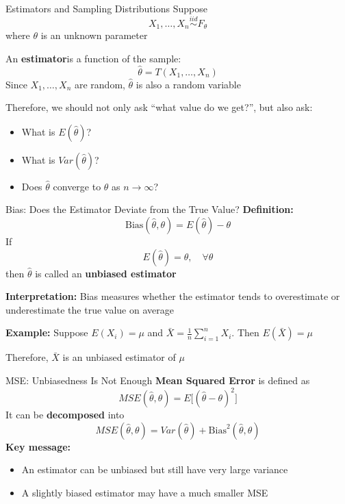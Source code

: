 \documentclass[aspectratio=169,12pt]{beamer}
\begin{document}
\begin{frame}{Estimators and Sampling Distributions}
    Suppose $$X_1, \dots,X_n \overset{iid}{\sim} F_\theta$$ where $\theta$ is an unknown parameter

    \vspace{0.5em}
    An \textbf{estimator}is a function of the sample:
    $$\hat{\theta}=T(X_1, \dots,X_n)$$ 
    Since $X_1, \dots, X_n$ are random, $\hat{\theta}$ is also a random variable

    Therefore, we should not only ask “what value do we get?”, but also ask:
        \begin{itemize}
            \item What is $E(\hat{\theta})$?
            \item What is $Var(\hat{\theta})$?
            \item Does $\hat{\theta}$ converge to $\theta$ as $n \to \infty$?
        \end{itemize}
\end{frame}

\begin{frame}{Bias: Does the Estimator Deviate from the True Value?}
    \textbf{Definition: }
    $$\mathrm{Bias}(\hat{\theta}, \theta)=E(\hat{\theta})-\theta$$ %
    If
    $$E(\hat{\theta})=\theta,\quad \forall \theta$$ %
    then $\hat{\theta}$ is called an \textbf{unbiased estimator}

    \vspace{0.8em}
    \textbf{Interpretation: } Bias measures whether the estimator tends to overestimate or underestimate the true value on average
    
    \vspace{0.8em}
    \textbf{Example:}
    Suppose $E(X_i)=\mu$ and $\bar X=\frac1n\sum_{i=1}^n X_i.$ Then $E(\bar X)=\mu$
    
    \vspace{0.8em}
    Therefore, $\bar X$ is an unbiased estimator of $\mu$
\end{frame}

\begin{frame}{MSE: Unbiasedness Is Not Enough}
    \vspace{-1em}
    \textbf{Mean Squared Error} is defined as
    \vspace{-0.8em}
    $$ MSE(\hat{\theta}, \theta)=E\big[(\hat{\theta}-\theta)^2\big]$$
    It can be \textbf{decomposed} into
    $$\boxed{ MSE(\hat{\theta}, \theta)=Var(\hat{\theta})+\mathrm{Bias}^2(\hat{\theta}, \theta)}$$
    \textbf{Key message: }
    \begin{itemize}
        \item An estimator can be unbiased but still have very large variance
        \item A slightly biased estimator may have a much smaller MSE
    \end{itemize}
\end{frame}
\end{document}
